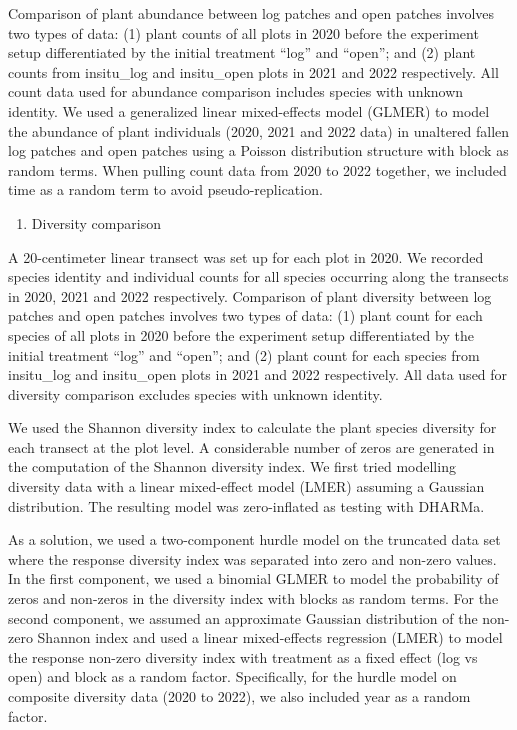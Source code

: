 \documentclass[
]{article}
\providecommand{\tightlist}{%
  \setlength{\itemsep}{0pt}\setlength{\parskip}{0pt}}
\begin{document}
Comparison of plant abundance between log patches and open patches
involves two types of data: (1) plant counts of all plots in 2020 before
the experiment setup differentiated by the initial treatment ``log'' and
``open''; and (2) plant counts from insitu\_log and insitu\_open plots
in 2021 and 2022 respectively. All count data used for abundance
comparison includes species with unknown identity. We used a generalized
linear mixed-effects model (GLMER) to model the abundance of plant
individuals (2020, 2021 and 2022 data) in unaltered fallen log patches
and open patches using a Poisson distribution structure with block as
random terms. When pulling count data from 2020 to 2022 together, we
included time as a random term to avoid pseudo-replication.

\begin{enumerate}
\def\labelenumi{\arabic{enumi}.}
\setcounter{enumi}{1}
\tightlist
\item
  Diversity comparison
\end{enumerate}

A 20-centimeter linear transect was set up for each plot in 2020. We
recorded species identity and individual counts for all species
occurring along the transects in 2020, 2021 and 2022 respectively.
Comparison of plant diversity between log patches and open patches
involves two types of data: (1) plant count for each species of all
plots in 2020 before the experiment setup differentiated by the initial
treatment ``log'' and ``open''; and (2) plant count for each species
from insitu\_log and insitu\_open plots in 2021 and 2022 respectively.
All data used for diversity comparison excludes species with unknown
identity.

We used the Shannon diversity index to calculate the plant species
diversity for each transect at the plot level. A considerable number of
zeros are generated in the computation of the Shannon diversity index.
We first tried modelling diversity data with a linear mixed-effect model
(LMER) assuming a Gaussian distribution. The resulting model was
zero-inflated as testing with DHARMa.

As a solution, we used a two-component hurdle model on the truncated
data set where the response diversity index was separated into zero and
non-zero values. In the first component, we used a binomial GLMER to
model the probability of zeros and non-zeros in the diversity index with
blocks as random terms. For the second component, we assumed an
approximate Gaussian distribution of the non-zero Shannon index and used
a linear mixed-effects regression (LMER) to model the response non-zero
diversity index with treatment as a fixed effect (log vs open) and block
as a random factor. Specifically, for the hurdle model on composite
diversity data (2020 to 2022), we also included year as a random factor.
\end{document}
